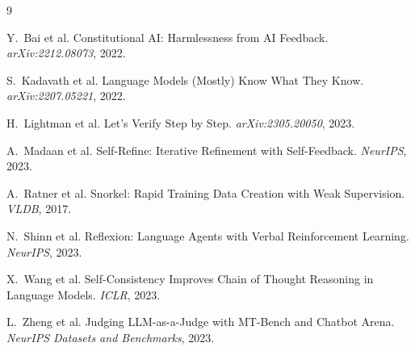 
\begin{thebibliography}{9}

Y.~Bai et al.
\newblock Constitutional AI: Harmlessness from AI Feedback.
\newblock \emph{arXiv:2212.08073}, 2022.

S.~Kadavath et al.
\newblock Language Models (Mostly) Know What They Know.
\newblock \emph{arXiv:2207.05221}, 2022.

H.~Lightman et al.
\newblock Let's Verify Step by Step.
\newblock \emph{arXiv:2305.20050}, 2023.

A.~Madaan et al.
\newblock Self-Refine: Iterative Refinement with Self-Feedback.
\newblock \emph{NeurIPS}, 2023.

A.~Ratner et al.
\newblock Snorkel: Rapid Training Data Creation with Weak Supervision.
\newblock \emph{VLDB}, 2017.

N.~Shinn et al.
\newblock Reflexion: Language Agents with Verbal Reinforcement Learning.
\newblock \emph{NeurIPS}, 2023.

X.~Wang et al.
\newblock Self-Consistency Improves Chain of Thought Reasoning in Language Models.
\newblock \emph{ICLR}, 2023.

L.~Zheng et al.
\newblock Judging LLM-as-a-Judge with MT-Bench and Chatbot Arena.
\newblock \emph{NeurIPS Datasets and Benchmarks}, 2023.

\end{thebibliography}
